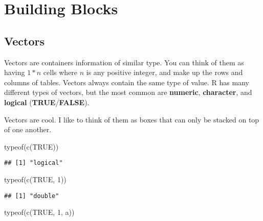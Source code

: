 \documentclass[
]{book}
\newenvironment{Shaded}{\begin{snugshade}}{\end{snugshade}}
\newcommand{\ConstantTok}[1]{\textcolor[rgb]{0.00,0.00,0.00}{#1}}
\newcommand{\DecValTok}[1]{\textcolor[rgb]{0.00,0.00,0.81}{#1}}
\newcommand{\FunctionTok}[1]{\textcolor[rgb]{0.00,0.00,0.00}{#1}}
\newcommand{\NormalTok}[1]{#1}
\newcommand{\StringTok}[1]{\textcolor[rgb]{0.31,0.60,0.02}{#1}}
\begin{document}
\hypertarget{functions}{%
\chapter{Building Blocks}\label{functions}}

\hypertarget{vectors}{%
\section{Vectors}\label{vectors}}

Vectors are containers information of similar type. You can think of them as having \(1*n\) cells where \(n\) is any positive integer, and make up the rows and columns of tables. Vectors always contain the same type of value. R has many different types of vectors, but the most common are \textbf{numeric}, \textbf{character}, and \textbf{logical} (\textbf{TRUE}/\textbf{FALSE}).

Vectors are cool. I like to think of them as boxes that can only be stacked on top of one another.

\begin{Shaded}
\begin{Highlighting}[]
\FunctionTok{typeof}\NormalTok{(}\FunctionTok{c}\NormalTok{(}\ConstantTok{TRUE}\NormalTok{))}
\end{Highlighting}
\end{Shaded}

\begin{verbatim}
## [1] "logical"
\end{verbatim}

\begin{Shaded}
\begin{Highlighting}[]
\FunctionTok{typeof}\NormalTok{(}\FunctionTok{c}\NormalTok{(}\ConstantTok{TRUE}\NormalTok{, }\DecValTok{1}\NormalTok{))}
\end{Highlighting}
\end{Shaded}

\begin{verbatim}
## [1] "double"
\end{verbatim}

\begin{Shaded}
\begin{Highlighting}[]
\FunctionTok{typeof}\NormalTok{(}\FunctionTok{c}\NormalTok{(}\ConstantTok{TRUE}\NormalTok{, }\DecValTok{1}\NormalTok{, }\StringTok{\textquotesingle{}a\textquotesingle{}}\NormalTok{))}
\end{Highlighting}
\end{Shaded}
\end{document}
